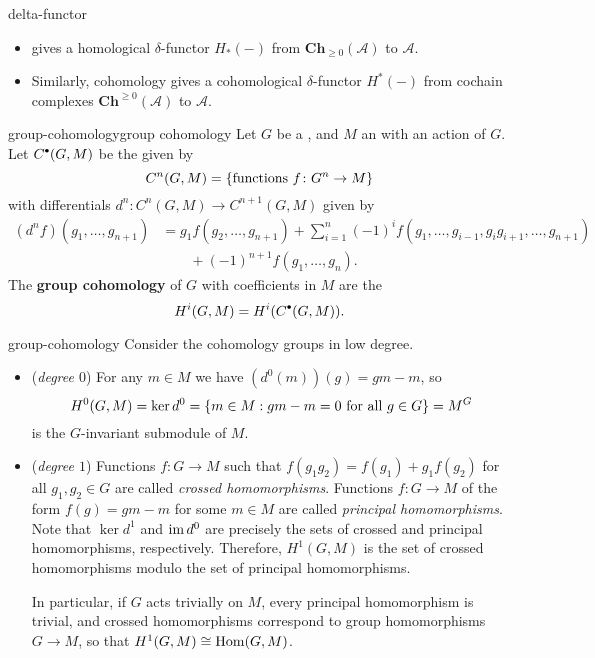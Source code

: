 \begin{example}{delta-functor}
    \begin{itemize}
        \item {} gives a homological $\delta$-functor $H_*(-)$ from  $\textbf{Ch}_{\ge 0}(\mathcal{A})$ to $\mathcal{A}$.
        \item Similarly, cohomology gives a cohomological $\delta$-functor $H^*(-)$ from cochain complexes $\textbf{Ch}^{\ge 0}(\mathcal{A})$ to $\mathcal{A}$.
    \end{itemize}
\end{example}

\begin{topic}{group-cohomology}{group cohomology}
    Let $G$ be a , and $M$ an  with an action of $G$. Let $C^\bdot(G, M)$ be the  given by
    \[ C^n(G, M) = \{ \textup{functions } f \colon G^n \to M \} \]
    with differentials $d^n \colon C^n(G, M) \to C^{n + 1}(G, M)$ given by
    \[ \begin{aligned} (d^n f)(g_1, \ldots, g_{n + 1}) &= g_1 f(g_2, \ldots, g_{n + 1}) + \sum_{i = 1}^{n} (-1)^i f(g_1, \ldots, g_{i - 1}, g_i g_{i + 1}, \ldots, g_{n + 1}) \\ &\qquad + (-1)^{n + 1} f(g_1, \ldots, g_n) . \end{aligned} \]
    The \textbf{group cohomology} of $G$ with coefficients in $M$ are the 
    \[ H^i(G, M) = H^i(C^\bdot(G, M)) . \]
\end{topic}

\begin{example}{group-cohomology}
    Consider the cohomology groups in low degree.
    \begin{itemize}
        \item (\textit{degree $0$}) For any $m \in M$ we have $(d^0(m))(g) = gm - m$, so
        \[ H^0(G, M) = \ker d^0 = \{ m \in M : gm - m = 0 \textup{ for all } g \in G \} = M^G \]
        is the $G$-invariant submodule of $M$.
        \item (\textit{degree $1$}) Functions $f \colon G \to M$ such that $f(g_1 g_2) = f(g_1) + g_1 f(g_2)$ for all $g_1, g_2 \in G$ are called \textit{crossed homomorphisms}. Functions $f \colon G \to M$ of the form $f(g) = gm - m$ for some $m \in M$ are called \textit{principal homomorphisms}. Note that $\ker d^1$ and $\operatorname{im} d^0$ are precisely the sets of crossed and principal homomorphisms, respectively. Therefore, $H^1(G, M)$ is the set of crossed homomorphisms modulo the set of principal homomorphisms.
        
        In particular, if $G$ acts trivially on $M$, every principal homomorphism is trivial, and crossed homomorphisms correspond to group homomorphisms $G \to M$, so that $H^1(G, M) \cong \operatorname{Hom}(G, M)$.
    \end{itemize}
\end{example}

